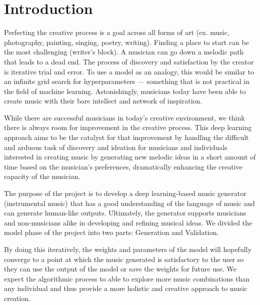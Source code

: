 \documentclass[12pt,oneside]{chicagocapstone}
\begin{document}
  \hypersetup{linkcolor=black}
  \setcounter{tocdepth}{2}
  \tableofcontents

  \listoffigures

  \listoftables


\mainmatter %
\pagestyle{fancyplain} %

\hypertarget{introduction}{%
\chapter*{Introduction}\label{introduction}}

Perfecting the creative process is a goal across all forms of art (ex. music, photography, painting, singing, poetry, writing). Finding a place to start can be the most challenging (writer's block). A musician can go down a melodic path that leads to a dead end. The process of discovery and satisfaction by the creator is iterative trial and error. To use a model as an analogy, this would be similar to an infinite grid search for hyperparameters --- something that is not practical in the field of machine learning. Astonishingly, musicians today have been able to create music with their bare intellect and network of inspiration.

While there are successful musicians in today's creative environment, we think there is always room for improvement in the creative process. This deep learning approach aims to be the catalyst for that improvement by handling the difficult and arduous task of discovery and ideation for musicians and individuals interested in creating music by generating new melodic ideas in a short amount of time based on the musician's preferences, dramatically enhancing the creative capacity of the musician.

The purpose of the project is to develop a deep learning-based music generator (instrumental music) that has a good understanding of the language of music and can generate human-like outputs. Ultimately, the generator supports musicians and non-musicians alike in developing and refining musical ideas. We divided the model phase of the project into two parts: Generation and Validation.

By doing this iteratively, the weights and parameters of the model will hopefully converge to a point at which the music generated is satisfactory to the user so they can use the output of the model or save the weights for future use. We expect the algorithmic process to able to explore more music combinations than any individual and thus provide a more holistic and creative approach to music creation.
\end{document}
